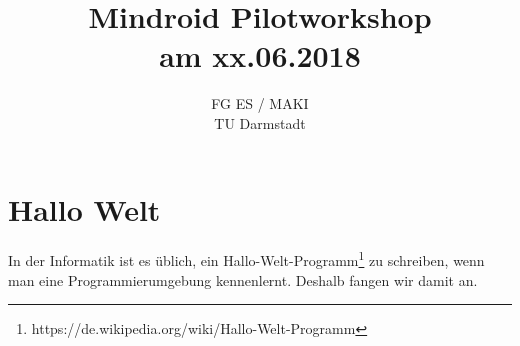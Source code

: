 \documentclass[
	12pt,
	article,
	type=bsc, %
	colorbacktitle,
	instlogo,
	accentcolor=tud1c,
	draft,
	german,
	twoside
]{tudexercise}
\begin{document}
	\author{}
	\title{Mindroid Pilotworkshop \\ am xx.06.2018}
	\subtitle{FG ES / MAKI \\ TU Darmstadt}
	\subsubtitle{}

	\maketitle
	
	
	
	\newpage
	\section{Hallo Welt}
	In der Informatik ist es üblich, ein Hallo-Welt-Programm\footnote{https://de.wikipedia.org/wiki/Hallo-Welt-Programm} zu schreiben, wenn man eine Programmierumgebung kennenlernt. Deshalb fangen wir damit an. 
	
\end{document}
